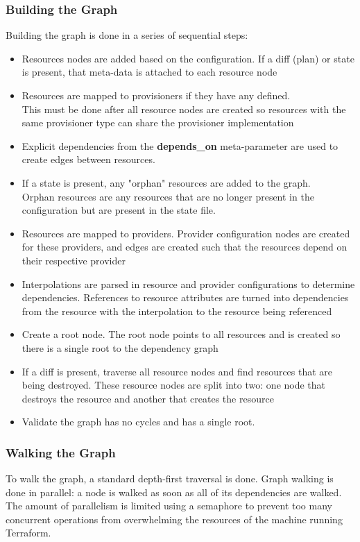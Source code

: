 \documentclass[12pt, letterpaper, twoside]{article}
\begin{document}
\subsubsection{Building the Graph}
Building the graph is done in a series of sequential steps:

\begin{itemize}
	\item Resources nodes are added based on the configuration. If a diff (plan) or state is present, 
		that meta-data is attached to each resource node
	\item Resources are mapped to provisioners if they have any defined.\\
		This must be done after all resource nodes are created so resources with the same provisioner 
		type can share the provisioner implementation
	\item Explicit dependencies from the \textbf{depends\_on} meta-parameter are used to create edges
		between resources.
	\item If a state is present, any "orphan" resources are added to the graph.\\
		Orphan resources are any resources that are no longer present in the configuration but are 
		present in the state file.
	\item Resources are mapped to providers. Provider configuration nodes are created for these providers,
		and edges are created such that the resources depend on their respective provider
	\item Interpolations are parsed in resource and provider configurations to determine dependencies. 
		References to resource attributes are turned into dependencies from the resource with the 
		interpolation to the resource being referenced
	\item Create a root node. The root node points to all resources and is created so there is a single
		root to the dependency graph
	\item If  a diff is present, traverse all resource nodes and find resources that are being destroyed. 
		These resource nodes are split into two: one node that destroys the resource and another that 
		creates the resource
	\item Validate the graph has no cycles and has a single root.
\end{itemize}

\subsubsection{Walking the Graph}
To walk the graph, a standard depth-first traversal is done. Graph walking is done in parallel: a node is 
walked as soon as all of its dependencies are walked.\\
The amount of parallelism is limited using a semaphore to prevent too many concurrent operations from 
overwhelming the resources of the machine running Terraform. 
\end{document}
